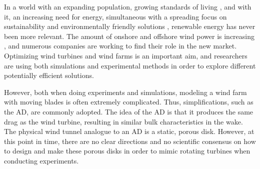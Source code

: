 In a world with an expanding population, growing standards of living \cite{StandardsOfLiving}, and with it, an increasing need for energy, simultaneous with a spreading focus on sustainability and environmentally friendly solutions \cite{sustainabilityFocus, Veers2019}, renewable energy has never been more relevant. The amount of onshore and offshore wind power is increasing \cite{MoreWind}, and numerous companies are working to find their role in the new market. Optimizing wind turbines and wind farms is an important aim, and researchers are using both simulations and experimental methods in order to explore different potentially efficient solutions. 


However, both when doing experiments and simulations, modeling a wind farm with moving blades is often extremely complicated. Thus, simplifications, such as the \gls{AD}, are commonly adopted. The idea of the \gls{AD} is that it produces the same drag as the wind turbine, resulting in similar bulk characteristics in the wake. The physical wind tunnel analogue to an \gls{AD} is a static, porous disk. However, at this point in time, there are no clear directions and no scientific consensus on how to design and make these porous disks in order to mimic rotating turbines when conducting experiments.  

